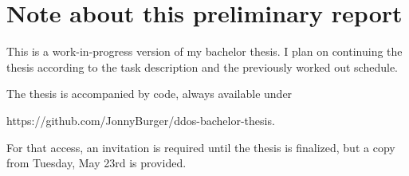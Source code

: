 \chapter{Note about this preliminary report}

This is a work-in-progress version of my bachelor thesis.
I plan on continuing the thesis according to the task description and the previously worked out schedule.

The thesis is accompanied by code, always available under

https://github.com/JonnyBurger/ddos-bachelor-thesis.

For that access, an invitation is required until the thesis is finalized, but a copy from Tuesday, May 23rd is provided.
